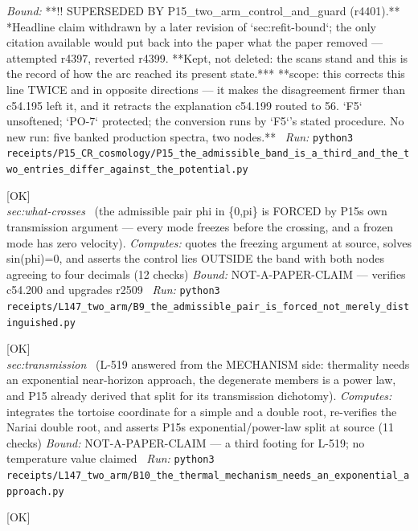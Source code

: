 \begin{description}
 \emph{Bound:} **!! SUPERSEDED BY P15\_two\_arm\_control\_and\_guard (r4401).** *Headline claim withdrawn by a later revision of `sec:refit-bound`; the only citation available would put back into the paper what the paper removed --- attempted r4397, reverted r4399. **Kept, not deleted: the scans stand and this is the record of how the arc reached its present state.*** **scope: this corrects this line TWICE and in opposite directions --- it makes the disagreement firmer than c54.195 left it, and it retracts the explanation c54.199 routed to 56. `F5` unsoftened; `PO-7` protected; the conversion runs by `F5`'s stated procedure. No new run: five banked production spectra, two nodes.**
\ \emph{Run:} \texttt{python3 receipts/P15\_CR\_cosmology/P15\_the\_admissible\_band\_is\_a\_third\_and\_the\_two\_entries\_differ\_against\_the\_potential.py}
\item[\label{rcpt:B9_the_admissible_pair_is_forced_not_merely_distinguished}\textbf{}\quad\texttt{B9\_the\_admissible\_pair\_is\_forced\_not\_merely\_distinguished}]\hfill\textsf{[OK]}\\
\textit{sec:what-crosses} \ (the admissible pair phi in \{0,pi\} is FORCED by P15s own transmission argument --- every mode freezes before the crossing, and a frozen mode has zero velocity). 
\emph{Computes:} quotes the freezing argument at source, solves sin(phi)=0, and asserts the control lies OUTSIDE the band with both nodes agreeing to four decimals (12 checks)
 \emph{Bound:} NOT-A-PAPER-CLAIM --- verifies c54.200 and upgrades r2509
\ \emph{Run:} \texttt{python3 receipts/L147\_two\_arm/B9\_the\_admissible\_pair\_is\_forced\_not\_merely\_distinguished.py}
\item[\label{rcpt:B10_the_thermal_mechanism_needs_an_exponential_approach}\textbf{}\quad\texttt{B10\_the\_thermal\_mechanism\_needs\_an\_exponential\_approach}]\hfill\textsf{[OK]}\\
\textit{sec:transmission} \ (L-519 answered from the MECHANISM side: thermality needs an exponential near-horizon approach, the degenerate members is a power law, and P15 already derived that split for its transmission dichotomy). 
\emph{Computes:} integrates the tortoise coordinate for a simple and a double root, re-verifies the Nariai double root, and asserts P15s exponential/power-law split at source (11 checks)
 \emph{Bound:} NOT-A-PAPER-CLAIM --- a third footing for L-519; no temperature value claimed
\ \emph{Run:} \texttt{python3 receipts/L147\_two\_arm/B10\_the\_thermal\_mechanism\_needs\_an\_exponential\_approach.py}
\item[\label{rcpt:PO-7}\textbf{}\quad\texttt{PO-7}]\hfill\textsf{[OK]}\\

\end{description}
